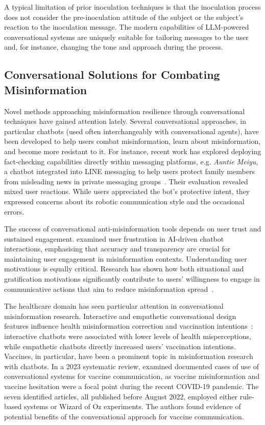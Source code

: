 \documentclass[sigconf]{acmart}
\begin{document}
A typical limitation of prior inoculation techniques is that the inoculation process does not consider the pre-inoculation attitude of the subject \cite{Zarzosa_Ruvalcaba_2025} or the subject's reaction to the inoculation message.
The modern capabilities of LLM-powered conversational systems are uniquely suitable for tailoring messages to the user and, for instance, changing the tone and approach during the process.

\subsection{Conversational Solutions for Combating Misinformation}

Novel methods approaching misinformation resilience through conversational techniques have gained attention lately.
Several conversational approaches, in particular chatbots (used often interchangeably with conversational agents), have been developed to help users combat misinformation, learn about misinformation, and become more resistant to it.
For instance, recent work has explored deploying fact-checking capabilities directly within messaging platforms, e.g. \textit{Auntie Meiyu}, a chatbot integrated into LINE messaging to help users protect family members from misleading news in private messaging groups~\cite{Lee2025}. 
Their evaluation revealed mixed user reactions. While users appreciated the bot's protective intent, they expressed concerns about its robotic communication style and the occasional errors. 

The success of conversational anti-misinformation tools depends on user trust and sustained engagement. 
\citet{Rossner2025263} examined user frustration in AI-driven chatbot interactions, emphasising that accuracy and transparency are crucial for maintaining user engagement in misinformation contexts. 
Understanding user motivations is equally critical. 
Research has shown how both situational and gratification motivations significantly contribute to users' willingness to engage in communicative actions that aim to reduce misinformation spread~\cite{Cheng2025643}.

The healthcare domain has seen particular attention in conversational misinformation research.
Interactive and empathetic conversational design features influence health misinformation correction and vaccination intentions~\cite{Gong2025276}: interactive chatbots were associated with lower levels of health misperceptions, while empathetic chatbots directly increased users' vaccination intentions. 
Vaccines, in particular, have been a prominent topic in misinformation research with chatbots. 
In a 2023 systematic review, \citet{Passanante_Pertwee_Lin_Lee_Wu_Larson_2023} examined documented cases of use of conversational systems for vaccine communication, as vaccine misinformation and vaccine hesitation were a focal point during the recent COVID-19 pandemic.
The seven identified articles, all published before August 2022, employed either rule-based systems or Wizard of Oz experiments.
The authors found evidence of potential benefits of the conversational approach for vaccine communication.
\end{document}
